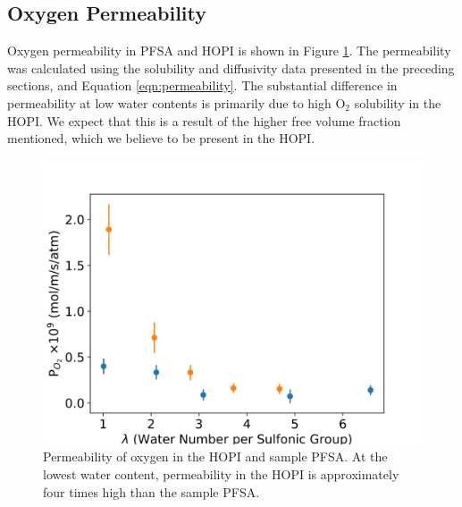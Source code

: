 \documentclass[journal=jacsat,manuscript=article]{achemso}
\begin{document}
\subsection{Oxygen Permeability}
Oxygen permeability in PFSA and HOPI is shown in Figure \ref{fig:permeability}. The permeability was calculated using the solubility and diffusivity data presented in the preceding sections, and Equation \ref{eqn:permeability}. The substantial difference in permeability at low water contents is primarily due to high O$_2$ solubility in the HOPI. We expect that this is a result of the higher free volume fraction mentioned, which we believe to be present in the HOPI.  
\begin{figure}[h!]
  \includegraphics[width=.9\linewidth]{perm_d2020.png}
  \centering
  \caption{Permeability of oxygen in the HOPI and sample PFSA. At the lowest water content, permeability in the HOPI is approximately four times high than the sample PFSA.} 
  \label{fig:permeability}
\end{figure}
\end{document}
